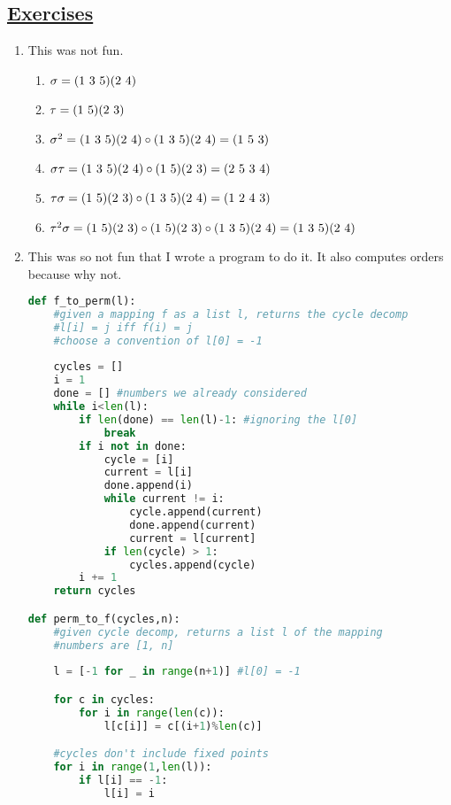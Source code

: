 \documentclass[]{article}
\newcommand*{\cycle}[1]{( \foreach \entry [count=\i] in {#1} {\ifnum\i>1\ \fi\entry})}
\begin{document}
\subsection*{\underline{Exercises}}
\begin{enumerate}

\item This was not fun.
\begin{enumerate}
\item $\sigma = \cycle{1,3,5}\cycle{2,4}$
\item $\tau = \cycle{1,5}\cycle{2,3}$
\item $\sigma^2 = \cycle{1,3,5}\cycle{2,4} \circ \cycle{1,3,5}\cycle{2,4} = \cycle{1,5,3}$
\item $\sigma\tau = \cycle{1,3,5}\cycle{2,4} \circ \cycle{1,5}\cycle{2,3} = \cycle{2,5,3,4}$
\item $\tau\sigma = \cycle{1,5}\cycle{2,3} \circ \cycle{1,3,5}\cycle{2,4} = \cycle{1,2,4,3}$
\item $\tau^2\sigma = \cycle{1,5}\cycle{2,3} \circ \cycle{1,5}\cycle{2,3} \circ \cycle{1,3,5}\cycle{2,4} = \cycle{1,3,5}\cycle{2,4}$
\end{enumerate}


\item This was so not fun that I wrote a program to do it. It also computes orders because why not.
\begin{lstlisting}[language=Python]
def f_to_perm(l):
    #given a mapping f as a list l, returns the cycle decomp
    #l[i] = j iff f(i) = j
    #choose a convention of l[0] = -1
    
    cycles = []
    i = 1
    done = [] #numbers we already considered
    while i<len(l):
        if len(done) == len(l)-1: #ignoring the l[0]
            break
        if i not in done:
            cycle = [i]
            current = l[i]
            done.append(i)
            while current != i:
                cycle.append(current)
                done.append(current)
                current = l[current]
            if len(cycle) > 1:
                cycles.append(cycle)
        i += 1
    return cycles

def perm_to_f(cycles,n):
    #given cycle decomp, returns a list l of the mapping
    #numbers are [1, n]
    
    l = [-1 for _ in range(n+1)] #l[0] = -1

    for c in cycles:
        for i in range(len(c)):
            l[c[i]] = c[(i+1)%len(c)]

    #cycles don't include fixed points
    for i in range(1,len(l)):
        if l[i] == -1:
            l[i] = i


\end{lstlisting}
\end{enumerate}
\end{document}
